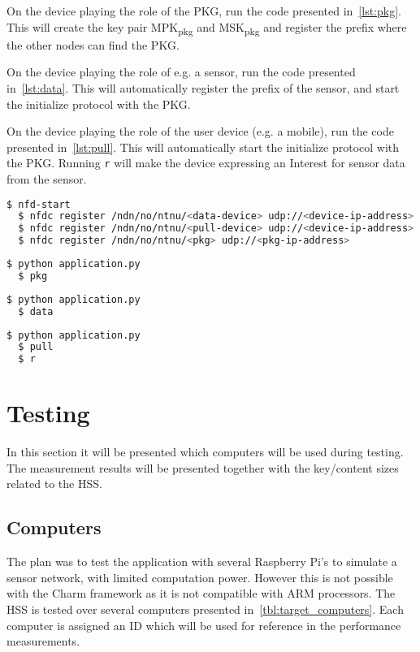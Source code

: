 On the device playing the role of the \gls{PKG}, run the code presented in~\autoref{lst:pkg}. 
This will create the key pair MPK\textsubscript{pkg} and MSK\textsubscript{pkg} and register the prefix where the other nodes can find the \gls{PKG}.

On the device playing the role of e.g. a sensor, run the code presented in~\autoref{lst:data}.
This will automatically register the prefix of the sensor, and start the initialize protocol with the \gls{PKG}.

On the device playing the role of the user device (e.g. a mobile), run the code presented in~\autoref{lst:pull}.
This will automatically start the initialize protocol with the \gls{PKG}.
Running \texttt{r} will make the device expressing an Interest for sensor data from the sensor.

\begin{lstlisting}[language=bash, caption={NFD Start}, label={lst:nfd-start}]
  $ nfd-start
  $ nfdc register /ndn/no/ntnu/<data-device> udp://<device-ip-address>
  $ nfdc register /ndn/no/ntnu/<pull-device> udp://<device-ip-address>
  $ nfdc register /ndn/no/ntnu/<pkg> udp://<pkg-ip-address>
\end{lstlisting}

\begin{lstlisting}[language=bash, caption={Start PKG}, label={lst:pkg}]
  $ python application.py
  $ pkg
\end{lstlisting}

\begin{lstlisting}[language=bash, caption={Start a device registering a prefix.}, label={lst:data}]
  $ python application.py
  $ data 
\end{lstlisting}

\begin{lstlisting}[language=bash, caption={Start a device that will express Interest in data.}, label={lst:pull}]
  $ python application.py
  $ pull
  $ r
\end{lstlisting}

\section{Testing}
In this section it will be presented which computers will be used during testing. 
The measurement results will be presented together with the key/content sizes related to the \gls{HSS}.

\subsection{Computers}
The plan was to test the application with several Raspberry Pi's to simulate a sensor network, with limited computation power.
However this is not possible with the Charm framework as it is not compatible with ARM processors.
The \gls{HSS} is tested over several computers presented in~\autoref{tbl:target_computers}.
Each computer is assigned an ID which will be used for reference in the performance measurements.

